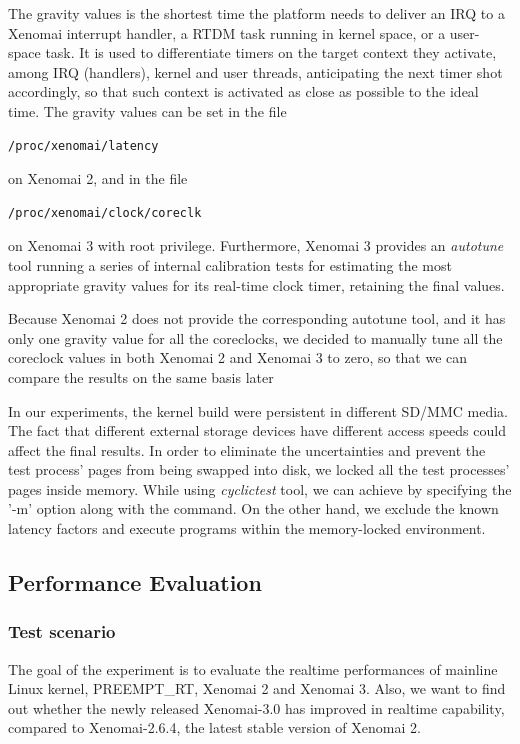 \documentclass[10pt,a4paper]{article}
\begin{document}
\begin{multicols}{2}
  The gravity values is the shortest time the platform needs to deliver an IRQ to a Xenomai interrupt handler, a RTDM task running in kernel space, or a user-space task. It is used to differentiate timers on the target context they activate, among IRQ (handlers), kernel and user threads, anticipating the next timer shot accordingly, so that such context is activated as close as possible to the ideal time. The gravity values can be set in the file \begin{verbatim}/proc/xenomai/latency
\end{verbatim} on Xenomai 2, and in the file
\begin{verbatim}/proc/xenomai/clock/coreclk
\end{verbatim} on Xenomai 3 with root privilege. Furthermore, Xenomai 3 provides an \textit{autotune} tool running a series of internal calibration tests for estimating the most appropriate gravity values for its real-time clock timer, retaining the final values.

Because Xenomai 2 does not provide the corresponding autotune tool, and it has only one gravity value for all the coreclocks, we decided to manually tune all the coreclock values in both Xenomai 2 and Xenomai 3 to zero, so that we can compare the results on the same basis later

In our experiments, the kernel build were persistent in different SD/MMC media. The fact that different external storage devices have different access speeds could affect the final results. In order to eliminate the uncertainties and prevent the test process' pages from being swapped into disk, we locked all the test processes' pages inside memory. While using \textit{cyclictest} tool, we can achieve by specifying the '-m' option along with the command. On the other hand, we exclude the known latency factors and execute programs within the memory-locked environment.

\subsection{Performance Evaluation}

\subsubsection{Test scenario}
The goal of the experiment is to evaluate the realtime performances of mainline Linux kernel, PREEMPT\_RT, 
Xenomai 2 and Xenomai 3. Also, we want to find out whether the newly released Xenomai-3.0 has improved in realtime capability, compared to Xenomai-2.6.4, the latest stable version of Xenomai 2.


\end{multicols}
\end{document}

